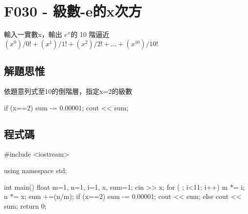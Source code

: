 \section{F030 - 級數-e的x次方}
輸入一實數x，輸出 $e^x$的 10 階逼近 $(x^0)/0!+(x^1)/1!+(x^2)/2!+...+(x^10)/10!$
\subsection{解題思惟}
依題意列式至10的倒階層，指定x=2的級數
\begin{inside}
	if (x==2) {
		sum -= 0.00001;
		cout << sum;
	}
\end{inside}

\subsection{程式碼}
\begin{cppcode}
#include <iostream>

using namespace std;

int main()
{
	float m=1, n=1, i=1, x, sum=1;
	cin >> x;
	for ( ; i<11; i++) {
		m *= i;
		n *= x;
		sum +=(n/m);
	}
	if (x==2) {
		sum -= 0.00001;
		cout << sum;
	}
	else cout << sum;
	return 0;
}
\end{cppcode}
